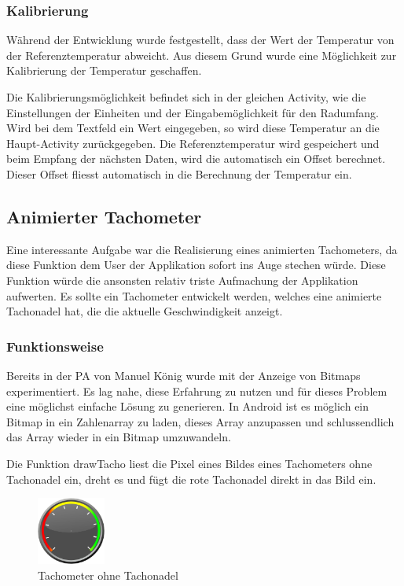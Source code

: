 
\subsubsection{Kalibrierung}

Während der Entwicklung wurde festgestellt, dass der Wert der Temperatur von der Referenztemperatur abweicht. Aus diesem Grund wurde eine Möglichkeit zur Kalibrierung der Temperatur geschaffen.

Die Kalibrierungsmöglichkeit befindet sich in der gleichen Activity, wie die Einstellungen der Einheiten und der Eingabemöglichkeit für den Radumfang. Wird bei dem Textfeld ein Wert eingegeben, so wird diese Temperatur an die Haupt-Activity zurückgegeben. Die Referenztemperatur wird gespeichert und beim Empfang der nächsten Daten, wird die automatisch ein Offset berechnet. Dieser Offset fliesst automatisch in die Berechnung der Temperatur ein.

\subsection{Animierter Tachometer}

Eine interessante Aufgabe war die Realisierung eines animierten Tachometers, da diese Funktion dem User der Applikation sofort ins Auge stechen würde. Diese Funktion würde die ansonsten relativ triste Aufmachung der Applikation aufwerten. Es sollte ein Tachometer entwickelt werden, welches eine animierte Tachonadel hat, die die aktuelle Geschwindigkeit anzeigt.

\subsubsection{Funktionsweise}

Bereits in der PA von Manuel König wurde mit der Anzeige von Bitmaps experimentiert. Es lag nahe, diese Erfahrung zu nutzen und für dieses Problem eine möglichst einfache Lösung zu generieren. In Android ist es möglich ein Bitmap in ein Zahlenarray zu laden, dieses Array anzupassen und schlussendlich das Array wieder in ein Bitmap umzuwandeln.

Die Funktion drawTacho liest die Pixel eines Bildes eines Tachometers ohne Tachonadel ein, dreht es und fügt die rote Tachonadel direkt in das Bild ein.

\begin{figure}[ht]
    \includegraphics[width=0.2\textwidth]{3Vorgehen/imag/tachometer.png}
    \caption{Tachometer ohne Tachonadel}
	\label{tachometer} 
\end{figure}

